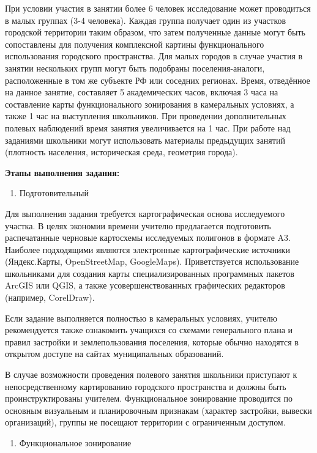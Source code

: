 \documentclass[
  11pt,
  russian,
]{book}
\providecommand{\tightlist}{%
  \setlength{\itemsep}{0pt}\setlength{\parskip}{0pt}}
\begin{document}
При условии участия в занятии более 6 человек исследование может проводиться в малых группах (3-4 человека). Каждая группа
получает один из участков городской территории таким образом, что затем полученные данные могут быть сопоставлены для получения комплексной картины функционального использования городского пространства. Для малых городов в случае участия в занятии нескольких групп могут быть подобраны поселения-аналоги, расположенные в том же субъекте РФ или соседних регионах.
Время, отведённое на данное занятие, составляет 5 академических часов, включая 3 часа на составление карты функционального
зонирования в камеральных условиях, а также 1 час на выступления школьников. При проведении дополнительных полевых наблюдений время занятия увеличивается на 1 час. При работе над заданиями школьники могут использовать материалы предыдущих занятий (плотность населения, историческая среда, геометрия города).

\textbf{Этапы выполнения задания:}

\begin{enumerate}
\def\labelenumi{\arabic{enumi}.}
\tightlist
\item
  Подготовительный
\end{enumerate}

Для выполнения задания требуется картографическая основа исследуемого участка. В целях экономии времени учителю
предлагается подготовить распечатанные черновые картосхемы исследуемых полигонов в формате A3. Наиболее подходящими являются электронные картографические источники (Яндекс.Карты, OpenStreetMap, GoogleMaps). Приветствуется использование школьниками для создания карты специализированных программных пакетов ArcGIS или QGIS, а также усовершенствованных графических редакторов (например, CorelDraw).

Если задание выполняется полностью в камеральных условиях, учителю рекомендуется также ознакомить учащихся со схемами
генерального плана и правил застройки и землепользования поселения, которые обычно находятся в открытом доступе на сайтах муниципальных образований.

В случае возможности проведения полевого занятия школьники приступают к непосредственному картированию городского пространства и
должны быть проинструктированы учителем. Функциональное зонирование проводится по основным визуальным и планировочным признакам (характер застройки, вывески организаций), группы не посещают территории с ограниченным доступом.

\begin{enumerate}
\def\labelenumi{\arabic{enumi}.}
\setcounter{enumi}{1}
\tightlist
\item
  Функциональное зонирование
\end{enumerate}
\end{document}
